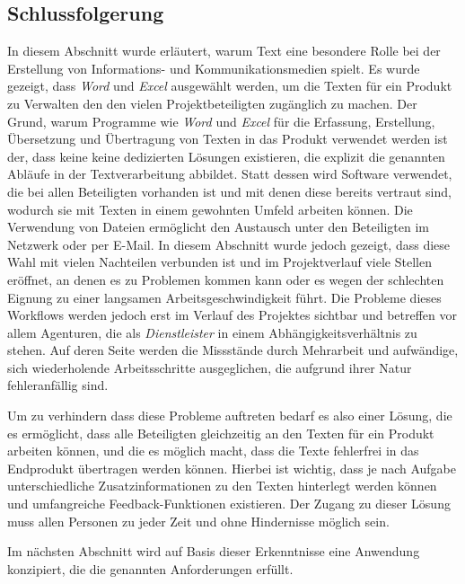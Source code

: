 \subsection{Schlussfolgerung}\label{l:schlussfolgerung}

In diesem Abschnitt wurde erläutert, warum Text eine besondere Rolle bei der Erstellung von Informations- und Kommunikationsmedien spielt. Es wurde gezeigt, dass \emph{Word} und \emph{Excel} ausgewählt werden, um die Texten für ein Produkt zu Verwalten den den vielen Projektbeteiligten zugänglich zu machen. Der Grund, warum Programme wie \emph{Word} und \emph{Excel} für die Erfassung, Erstellung, Übersetzung und Übertragung von Texten in das Produkt verwendet werden ist der, dass keine keine dedizierten Lösungen existieren, die explizit die genannten Abläufe in der Textverarbeitung abbildet. Statt dessen wird Software verwendet, die bei allen Beteiligten vorhanden ist und mit denen diese bereits vertraut sind, wodurch sie mit Texten in einem gewohnten Umfeld arbeiten können. Die Verwendung von Dateien ermöglicht den Austausch unter den Beteiligten im Netzwerk oder per E-Mail. In diesem Abschnitt wurde jedoch gezeigt, dass diese Wahl mit vielen Nachteilen verbunden ist und im Projektverlauf viele Stellen eröffnet, an denen es zu Problemen kommen kann oder es wegen der schlechten Eignung zu einer langsamen Arbeitsgeschwindigkeit führt. Die Probleme dieses Workflows werden jedoch erst im Verlauf des Projektes sichtbar und betreffen vor allem Agenturen, die als \emph{Dienstleister} in einem Abhängigkeitsverhältnis zu stehen. Auf deren Seite werden die Missstände durch Mehrarbeit und aufwändige, sich wiederholende Arbeitsschritte ausgeglichen, die aufgrund ihrer Natur fehleranfällig sind.

Um zu verhindern dass diese Probleme auftreten bedarf es also einer Lösung, die es ermöglicht, dass alle Beteiligten gleichzeitig an den Texten für ein Produkt arbeiten können, und die es möglich macht, dass die Texte fehlerfrei in das Endprodukt übertragen werden können. Hierbei ist wichtig, dass je nach Aufgabe unterschiedliche Zusatzinformationen zu den Texten hinterlegt werden können und umfangreiche Feedback-Funktionen existieren. Der Zugang zu dieser Lösung muss allen Personen zu jeder Zeit und ohne Hindernisse möglich sein. 

\bigskip

Im nächsten Abschnitt wird auf Basis dieser Erkenntnisse eine Anwendung konzipiert, die die genannten Anforderungen erfüllt.